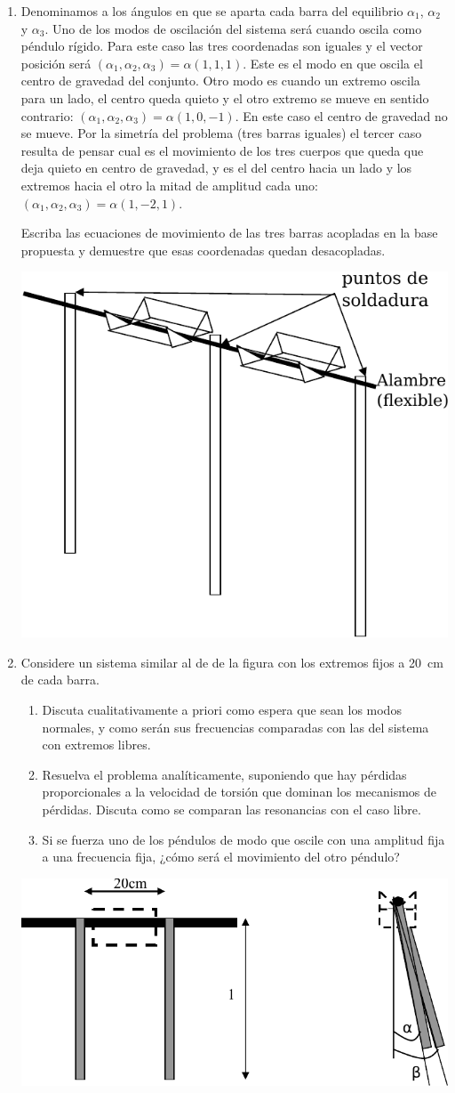 \documentclass[11pt,spanish,a4paper]{article}
\begin{document}
\begin{enumerate}
\item Denominamos a los ángulos en que se aparta cada barra del equilibrio \(\alpha_1\), \(\alpha_2\) y \(\alpha_3\).
	Uno de los modos de oscilación del sistema será cuando oscila como péndulo rígido.
	Para este caso las tres coordenadas son iguales y el vector posición será \((\alpha_1, \alpha_2, \alpha_3)= \alpha (1,1,1) \).
	Este es el modo en que oscila el centro de gravedad del conjunto.
	Otro modo es cuando un extremo oscila para un lado, el centro queda quieto y el otro extremo se mueve en sentido contrario: \((\alpha_1, \alpha_2, \alpha_3)= \alpha (1,0,-1)\).
	En este caso el centro de gravedad no se mueve.
	Por la simetría del problema (tres barras iguales) el tercer caso resulta de pensar cual es el movimiento de los tres cuerpos que queda que deja quieto en centro de gravedad, y es el del centro hacia un lado y los extremos hacia el otro la mitad de amplitud cada uno: \((\alpha_1, \alpha_2, \alpha_3)= \alpha(1, -2, 1)\).
	
	Escriba las ecuaciones de movimiento de las tres barras acopladas en la base propuesta y demuestre que esas coordenadas quedan desacopladas.
    \begin{center}
		\includegraphics[width=0.4\linewidth]{g02e05}
	\end{center}


\item\label{torsion} Considere un sistema similar al de de la figura con los extremos fijos a \SI{20}{cm} de cada barra.
\begin{enumerate}
	\item Discuta cualitativamente a priori como espera que sean los modos normales, y como serán sus frecuencias comparadas con las del sistema con extremos libres.
	\item Resuelva el problema analíticamente, suponiendo que hay pérdidas proporcionales a la
	      velocidad de torsión que dominan los mecanismos de pérdidas.
		  Discuta como se comparan las resonancias con el caso libre.
	\item Si se fuerza uno de los péndulos de modo que oscile con una amplitud fija a una frecuencia fija, ¿cómo será el movimiento del otro péndulo?
\end{enumerate}
    \begin{center}
		\includegraphics[width=0.4\linewidth]{g02e06}
	\end{center}


\end{enumerate}
\end{document}
